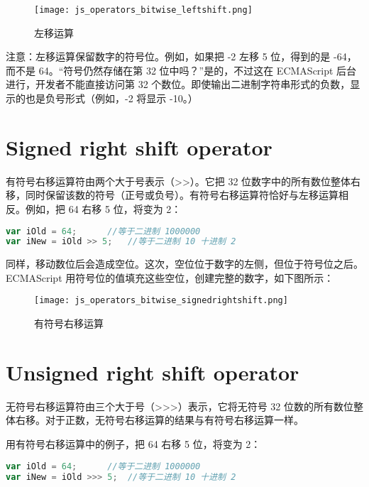 \begin{figure}[!h]
\centering
\texttt{[image: js\_operators\_bitwise\_leftshift.png]}
\caption{左移运算}
\label{js_operators_bitwise_leftshift}
\end{figure}

注意：左移运算保留数字的符号位。例如，如果把 -2 左移 5 位，得到的是 -64，而不是 64。“符号仍然存储在第 32 位中吗？”是的，不过这在 ECMAScript 后台进行，开发者不能直接访问第 32 个数位。即使输出二进制字符串形式的负数，显示的也是负号形式（例如，-2 将显示 -10。）






\section{Signed right shift operator}


有符号右移运算符由两个大于号表示（>\/>）。它把 32 位数字中的所有数位整体右移，同时保留该数的符号（正号或负号）。有符号右移运算符恰好与左移运算相反。例如，把 64 右移 5 位，将变为 2：

\begin{lstlisting}[language=JavaScript]
var iOld = 64;		//等于二进制 1000000
var iNew = iOld >> 5;	//等于二进制 10 十进制 2
\end{lstlisting}


同样，移动数位后会造成空位。这次，空位位于数字的左侧，但位于符号位之后。ECMAScript 用符号位的值填充这些空位，创建完整的数字，如下图所示：

\begin{figure}[!h]
\centering
\texttt{[image: js\_operators\_bitwise\_signedrightshift.png]}
\caption{有符号右移运算}
\label{js_operators_bitwise_signedrightshift}
\end{figure}





\section{Unsigned right shift operator}

无符号右移运算符由三个大于号（>\/>\/>）表示，它将无符号 32 位数的所有数位整体右移。对于正数，无符号右移运算的结果与有符号右移运算一样。


用有符号右移运算中的例子，把 64 右移 5 位，将变为 2：

\begin{lstlisting}[language=JavaScript]
var iOld = 64;		//等于二进制 1000000
var iNew = iOld >>> 5;	//等于二进制 10 十进制 2
\end{lstlisting}

